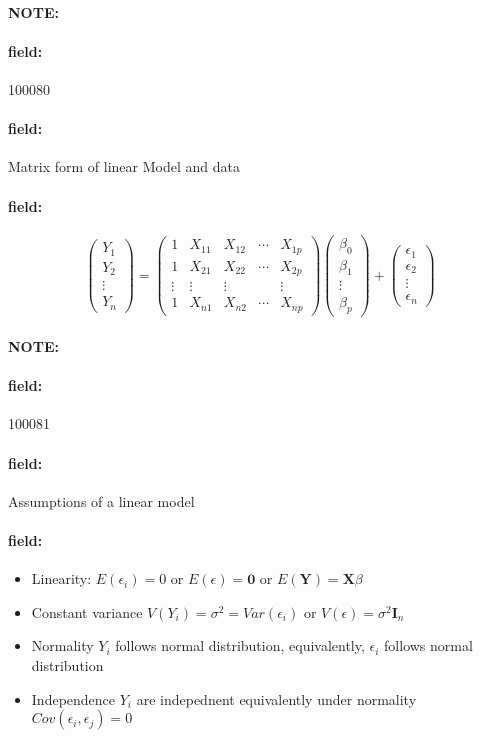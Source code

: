 \documentclass[12pt]{article}
\newenvironment{note}{\paragraph{NOTE:}}{}
\newenvironment{field}{\paragraph{field:}}{}
\begin{document}
\begin{note} \begin{field} \tiny 100080 \end{field}
  \begin{field}
    Matrix form of linear Model and data
  \end{field}
  \begin{field}
    $$ \begin{pmatrix}
      Y_1 \\ Y_2 \\ \vdots \\ Y_n
    \end{pmatrix}  = \begin{pmatrix}
      1 & X_{11} & X_{12} & \cdots & X_{1p}\\
      1 & X_{21} & X_{22} & \cdots & X_{2p}\\
      \vdots & \vdots & \vdots & & \vdots \\
      1 & X_{n1} & X_{n2} & \cdots & X_{np}
    \end{pmatrix} \begin{pmatrix}
      \beta_0 \\ \beta_1 \\ \vdots \\ \beta_p
    \end{pmatrix} + \begin{pmatrix}
      \epsilon_1 \\ \epsilon_2 \\ \vdots \\ \epsilon_n
    \end{pmatrix}$$
  \end{field}
\end{note}


\begin{note} \begin{field} \tiny 100081 \end{field}
  \begin{field}
    Assumptions of a linear model
  \end{field}
  \begin{field}
    \begin{itemize}
      \item Linearity: $E(\epsilon_i) = 0$ or $E(\epsilon) = \mathbf{0}$ or $E(\mathbf{Y}) = \mathbf{X}\beta$
      \item Constant variance $V(Y_i) = \sigma^2 = Var(\epsilon_i)$ or $V(\epsilon) = \sigma^2 \mathbf{I}_n$
      \item Normality $Y_i$ follows normal distribution, equivalently, $\epsilon_i$ follows normal distribution
      \item Independence $Y_i$ are indepednent equivalently under normality $Cov(\epsilon_i, \epsilon_j) = 0$
    \end{itemize}
  \end{field}
\end{note}
\end{document}
